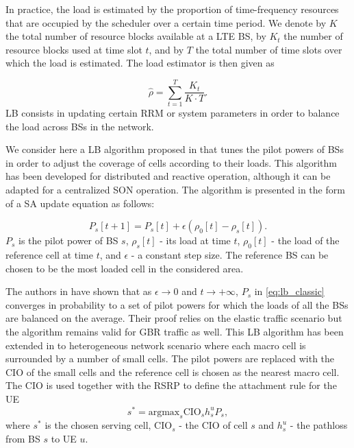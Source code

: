 \documentclass[10pt,draftclsnofoot,onecolumn]{IEEEtran}
\begin{document}
    In practice, the load is estimated by the proportion of time-frequency resources that
are occupied by the scheduler over a certain time period. We denote
by $K$ the total number of resource blocks available at a \ac{LTE}
\ac{BS}, by $K_t$ the number of resource blocks used at time slot
$t$, and by $T$ the total number of time slots over which the load is
estimated. The load estimator is then given as

    \begin{equation} \label{eq:load_local_estimate}
    \hat{\rho} = \sum_{t=1}^T \frac{K_t}{K \cdot T}.
    \end{equation}
\ac{LB} consists in updating certain \ac{RRM} or system parameters in order to balance the load across \acp{BS} in the network.

We consider here a \ac{LB} algorithm proposed in
\cite{combes_selforganizationwireless_2012} that tunes the pilot
powers of \acp{BS} in order to adjust the coverage of cells
according to their loads. This algorithm has been developed for
distributed and reactive operation, although it can be adapted for a
centralized \ac{SON} operation. The algorithm is presented in the
form of a \ac{SA} update equation as follows:

    \begin{equation} \label{eq:lb_classic}
    P_s[t+1] = P_s[t] + \epsilon (\rho_0[t] - \rho_s[t]).
    \end{equation}
$P_s$ is the pilot power of \ac{BS} $s$, $\rho_s[t]$ - its load
at time $t$, $\rho_0[t]$ - the load of the reference cell at time
$t$, and $\epsilon$ - a constant step size. The reference \ac{BS} can
be chosen to be the most loaded cell in the considered area.

    The authors in \cite{combes_selforganizationwireless_2012} have 
shown that as $\epsilon \to 0$ and $t \to +\infty$, $P_s$ in \eqref{eq:lb_classic} 
converges in probability to a set of pilot powers for which the
loads of all the \acp{BS} are balanced on the average. Their proof
relies on the elastic traffic scenario but the algorithm remains
valid for \ac{GBR} traffic as well. This \ac{LB} algorithm
has been extended in \cite{tall_selforganizingstrategies_2014} to
heterogeneous network scenario where each macro cell is surrounded by a
number of small cells. The pilot powers are replaced with the
\ac{CIO} of the small cells and the reference cell is chosen as the
nearest macro cell. The \ac{CIO} is used together with the \ac{RSRP} to define the attachment rule for the \ac{UE}
\begin{equation}
s^* = \text{argmax}_s \text{CIO}_s h_s^u P_s,
\end{equation}
where $s^*$ is the chosen serving cell, $\text{CIO}_s$ - the \ac{CIO} of cell $s$ and $h_s^u$ - the pathloss from \ac{BS} $s$ to \ac{UE} $u$.
\end{document}

